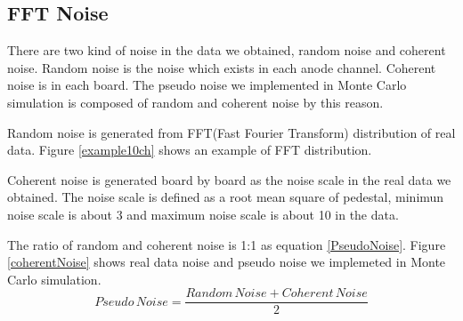 \subsection{FFT Noise}
There are two kind of noise in the data we obtained, random noise and coherent noise.
Random noise is the noise which exists in each anode channel.
Coherent noise is in each board.
The pseudo noise we implemented in Monte Carlo simulation is composed of random and coherent noise by this reason.

Random noise is generated from FFT(Fast Fourier Transform) distribution of real data. Figure \ref{example10ch} shows an example of FFT distribution.

Coherent noise is generated board by board as the noise scale in the real data we obtained.
The noise scale is defined as a root mean square of pedestal, minimun noise scale is about 3 and maximum noise scale is about 10 in the data.

The ratio of random and coherent noise is 1:1 as equation \ref{PseudoNoise}.
Figure \ref{coherentNoise} shows real data noise and pseudo noise we implemeted in Monte Carlo simulation.
\begin{equation}
  Pseudo\,Noise = \frac{Random\,Noise + Coherent\,Noise}{2}
  \label{PseudoNoise}
\end{equation}

